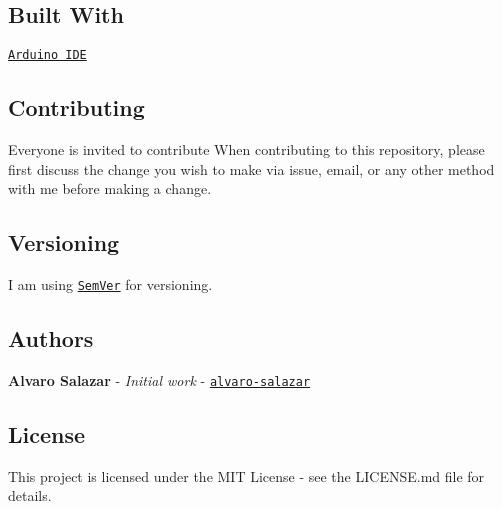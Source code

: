 \subsection*{Built With}


\begin{DoxyItemize}
\item \href{https://www.arduino.cc/}{\tt Arduino I\+DE}
\end{DoxyItemize}

\subsection*{Contributing}

Everyone is invited to contribute When contributing to this repository, please first discuss the change you wish to make via issue, email, or any other method with me before making a change.

\subsection*{Versioning}

I am using \href{http://semver.org/}{\tt Sem\+Ver} for versioning.

\subsection*{Authors}


\begin{DoxyItemize}
\item {\bfseries Alvaro Salazar} -\/ {\itshape Initial work} -\/ \href{https://github.com/alvaro-salazar}{\tt alvaro-\/salazar}
\end{DoxyItemize}

\subsection*{License}

This project is licensed under the M\+IT License -\/ see the L\+I\+C\+E\+N\+SE.md file for details. 